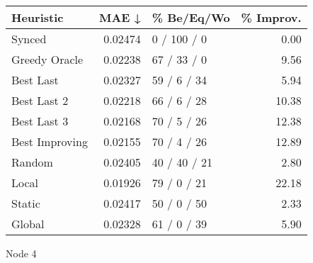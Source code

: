 \begin{tabular}{lrlr}
\toprule
\textbf{Heuristic} & \textbf{MAE ↓} & \textbf{\% Be/Eq/Wo} & \textbf{\% Improv.} \\
\midrule
            Synced &        0.02474 &          0 / 100 / 0 &                0.00 \\
     Greedy Oracle &        0.02238 &          67 / 33 / 0 &                9.56 \\
         Best Last &        0.02327 &          59 / 6 / 34 &                5.94 \\
       Best Last 2 &        0.02218 &          66 / 6 / 28 &               10.38 \\
       Best Last 3 &        0.02168 &          70 / 5 / 26 &               12.38 \\
    Best Improving &        0.02155 &          70 / 4 / 26 &               12.89 \\
            Random &        0.02405 &         40 / 40 / 21 &                2.80 \\
             Local &        0.01926 &          79 / 0 / 21 &               22.18 \\
            Static &        0.02417 &          50 / 0 / 50 &                2.33 \\
            Global &        0.02328 &          61 / 0 / 39 &                5.90 \\
\bottomrule
\end{tabular}
\caption{Node 4}
\label{tab:non_lr01_le1_bs2_4}
